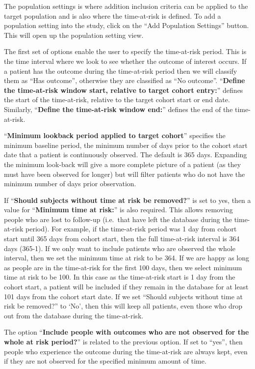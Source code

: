 \documentclass[11pt]{book}
\theoremstyle{definition}
\theoremstyle{definition}
\theoremstyle{definition}
\theoremstyle{remark}
\begin{document}
The population settings is where addition inclusion criteria can be applied to the target population and is also where the time-at-risk is defined. To add a population setting into the study, click on the ``Add Population Settings'' button. This will open up the population setting view.

The first set of options enable the user to specify the time-at-risk period. This is the time interval where we look to see whether the outcome of interest occurs. If a patient has the outcome during the time-at-risk period then we will classify them as ``Has outcome'', otherwise they are classified as ``No outcome''. ``\textbf{Define the time-at-risk window start, relative to target cohort entry:}'' defines the start of the time-at-risk, relative to the target cohort start or end date. Similarly, ``\textbf{Define the time-at-risk window end:}'' defines the end of the time-at-risk.

``\textbf{Minimum lookback period applied to target cohort}'' specifies the minimum baseline period, the minimum number of days prior to the cohort start date that a patient is continuously observed. The default is 365 days. Expanding the minimum look-back will give a more complete picture of a patient (as they must have been observed for longer) but will filter patients who do not have the minimum number of days prior observation.

If ``\textbf{Should subjects without time at risk be removed?}'' is set to yes, then a value for ``\textbf{Minimum time at risk:}'' is also required. This allows removing people who are lost to follow-up (i.e.~that have left the database during the time-at-risk period). For example, if the time-at-risk period was 1 day from cohort start until 365 days from cohort start, then the full time-at-risk interval is 364 days (365-1). If we only want to include patients who are observed the whole interval, then we set the minimum time at risk to be 364. If we are happy as long as people are in the time-at-risk for the first 100 days, then we select minimum time at risk to be 100. In this case as the time-at-risk start is 1 day from the cohort start, a patient will be included if they remain in the database for at least 101 days from the cohort start date. If we set ``Should subjects without time at risk be removed?'' to `No', then this will keep all patients, even those who drop out from the database during the time-at-risk.

The option ``\textbf{Include people with outcomes who are not observed for the whole at risk period?}'' is related to the previous option. If set to ``yes'', then people who experience the outcome during the time-at-risk are always kept, even if they are not observed for the specified minimum amount of time.
\end{document}
